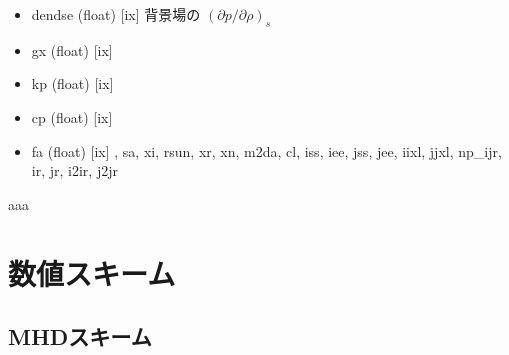 \documentclass[letterpaper,10pt,dvipdfmx,report]{sphinxmanual}
\begin{document}
\begin{fulllineitems}
\begin{itemize}
\item {} 
dendse (float) {[}ix{]} \sphinxhyphen{}\sphinxhyphen{} 背景場の \((\partial p/\partial \rho)_s\)

\item {} 
gx (float) {[}ix{]} \sphinxhyphen{}\sphinxhyphen{}

\item {} 
kp (float) {[}ix{]} \sphinxhyphen{}\sphinxhyphen{}

\item {} 
cp (float) {[}ix{]} \sphinxhyphen{}\sphinxhyphen{}

\item {} 
fa (float) {[}ix{]} \sphinxhyphen{}\sphinxhyphen{}\textquotesingle{}, \textquotesingle{}sa\textquotesingle{}, \textquotesingle{}xi\textquotesingle{}, \textquotesingle{}rsun\textquotesingle{}, \textquotesingle{}xr\textquotesingle{}, \textquotesingle{}xn\textquotesingle{}, \textquotesingle{}m2da\textquotesingle{}, \textquotesingle{}cl\textquotesingle{}, \textquotesingle{}iss\textquotesingle{}, \textquotesingle{}iee\textquotesingle{}, \textquotesingle{}jss\textquotesingle{}, \textquotesingle{}jee\textquotesingle{}, \textquotesingle{}iixl\textquotesingle{}, \textquotesingle{}jjxl\textquotesingle{}, \textquotesingle{}np\_ijr\textquotesingle{}, \textquotesingle{}ir\textquotesingle{}, \textquotesingle{}jr\textquotesingle{}, \textquotesingle{}i2ir\textquotesingle{}, \textquotesingle{}j2jr\textquotesingle{}

\end{itemize}

\end{fulllineitems}


\begin{fulllineitems}
\label{\detokenize{notation:a}}
aaa

\end{fulllineitems}



\chapter{数値スキーム}
\label{\detokenize{scheme:id1}}\label{\detokenize{scheme::doc}}

\section{MHDスキーム}
\label{\detokenize{scheme:mhd}}
\end{document}
